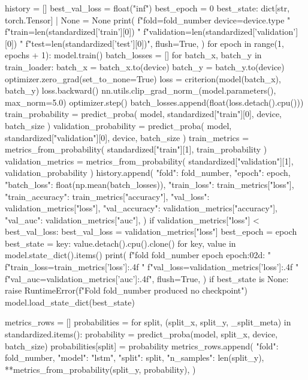 \documentclass[UTF8,a4paper,fontset=fandol]{ctexart}
\begin{document}
\begin{ProjectCode}
{{    history = []
    best_val_loss = float("inf")
    best_epoch = 0
    best_state: dict[str, torch.Tensor] | None = None
    print(
        f"fold={fold_number} device={device.type} "
        f"train={len(standardized['train'][0])} "
        f"validation={len(standardized['validation'][0])} "
        f"test={len(standardized['test'][0])}",
        flush=True,
    )
    for epoch in range(1, epochs + 1):
        model.train()
        batch_losses = []
        for batch_x, batch_y in train_loader:
            batch_x = batch_x.to(device)
            batch_y = batch_y.to(device)
            optimizer.zero_grad(set_to_none=True)
            loss = criterion(model(batch_x), batch_y)
            loss.backward()
            nn.utils.clip_grad_norm_(model.parameters(), max_norm=5.0)
            optimizer.step()
            batch_losses.append(float(loss.detach().cpu()))
        train_probability = predict_proba(
            model, standardized["train"][0], device, batch_size
        )
        validation_probability = predict_proba(
            model, standardized["validation"][0], device, batch_size
        )
        train_metrics = metrics_from_probability(
            standardized["train"][1], train_probability
        )
        validation_metrics = metrics_from_probability(
            standardized["validation"][1], validation_probability
        )
        history.append({
            "fold": fold_number,
            "epoch": epoch,
            "batch_loss": float(np.mean(batch_losses)),
            "train_loss": train_metrics["loss"],
            "train_accuracy": train_metrics["accuracy"],
            "val_loss": validation_metrics["loss"],
            "val_accuracy": validation_metrics["accuracy"],
            "val_auc": validation_metrics["auc"],
        })
        if validation_metrics["loss"] < best_val_loss:
            best_val_loss = validation_metrics["loss"]
            best_epoch = epoch
            best_state = {
                key: value.detach().cpu().clone()
                for key, value in model.state_dict().items()
            }
        print(
            f"fold {fold_number} epoch {epoch:02d}: "
            f"train_loss={train_metrics['loss']:.4f} "
            f"val_loss={validation_metrics['loss']:.4f} "
            f"val_auc={validation_metrics['auc']:.4f}",
            flush=True,
        )
    if best_state is None:
        raise RuntimeError(f"Fold {fold_number} produced no checkpoint")
    model.load_state_dict(best_state)

    metrics_rows = []
    probabilities = {}
    for split, (split_x, split_y, _split_meta) in standardized.items():
        probability = predict_proba(model, split_x, device, batch_size)
        probabilities[split] = probability
        metrics_rows.append({
            "fold": fold_number,
            "model": "lstm",
            "split": split,
            "n_samples": len(split_y),
            **metrics_from_probability(split_y, probability),
        })

}}
\end{ProjectCode}
\end{document}

